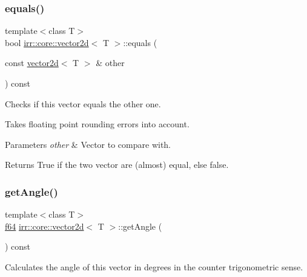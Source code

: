 \subsubsection{\texorpdfstring{equals()}{equals()}\hspace{0.1cm}{\footnotesize\ttfamily [2/2]}}
{\footnotesize\ttfamily template$<$class T$>$ \\
bool \hyperlink{classirr_1_1core_1_1vector2d}{irr\+::core\+::vector2d}$<$ T $>$\+::equals (\begin{DoxyParamCaption}\item[{const \hyperlink{classirr_1_1core_1_1vector2d}{vector2d}$<$ T $>$ \&}]{other }\end{DoxyParamCaption}) const\hspace{0.3cm}{\ttfamily [inline]}}



Checks if this vector equals the other one. 

Takes floating point rounding errors into account. 
\begin{DoxyParams}{Parameters}
{\em other} & Vector to compare with. \\
\hline
\end{DoxyParams}
\begin{DoxyReturn}{Returns}
True if the two vector are (almost) equal, else false. 
\end{DoxyReturn}
\mbox{\label{classirr_1_1core_1_1vector2d_ad41700e8cbebb9899430c576140ee6fd}} 
\subsubsection{\texorpdfstring{get\+Angle()}{getAngle()}\hspace{0.1cm}{\footnotesize\ttfamily [1/2]}}
{\footnotesize\ttfamily template$<$class T$>$ \\
\hyperlink{namespaceirr_a1325b02603ad449f92c68fc640af9b28}{f64} \hyperlink{classirr_1_1core_1_1vector2d}{irr\+::core\+::vector2d}$<$ T $>$\+::get\+Angle (\begin{DoxyParamCaption}{ }\end{DoxyParamCaption}) const\hspace{0.3cm}{\ttfamily [inline]}}



Calculates the angle of this vector in degrees in the counter trigonometric sense. 

